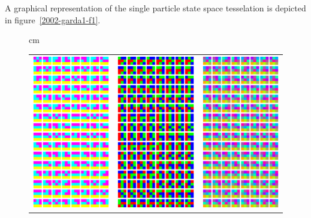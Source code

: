 \documentclass{article}
\begin{document}
A graphical representation of the single particle state space tesselation
is depicted in figure~\ref{2002-garda1-f1}.
\begin{figure}
\begin{center}
 cm
\begin{tabular}{ccc}
 \includegraphics[width=5.1cm]{2002-garda1-f1.eps} &
 \includegraphics[width=5.1cm]{2002-garda1-f2.eps} &
 \includegraphics[width=5.1cm]{2002-garda1-f1u2.eps}\\

\end{tabular}
\end{center}
\end{figure}
\end{document}
